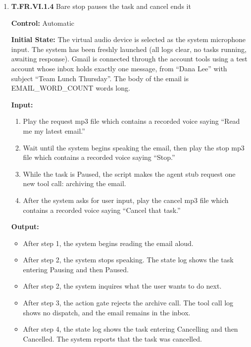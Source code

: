 \documentclass[12pt, titlepage]{article}
\begin{document}
\begin{enumerate}
\textbf{How test will be performed:} 

A script plays the audio file into the
virtual device and reads the session event log. It watches the event log for the start of
read-back speech to trigger step 2 and for the corrected read-back to trigger
step 3. After the run, the script reads the task manager's state log and task
ID. It then asserts each pass criterion above.


\item{\textbf{T.FR.VI.1.4} Bare stop pauses the task and cancel ends it\\}\label{test:T.FR.VI.1.4}

\textbf{Control:} Automatic

\textbf{Initial State:} 
The virtual audio device is selected as the system
microphone input.  The system has been freshly launched (all logs clear, no tasks running, awaiting response).
Gmail is connected through the account tools using a test account whose inbox holds exactly one message, 
from ``Dana Lee'' with subject ``Team Lunch Thursday''. The body of the email is \textsc{EMAIL\_WORD\_COUNT} words long.

\textbf{Input:}
\begin{enumerate}
  \item Play the request mp3 file which contains a recorded voice saying ``Read me my latest email.''
  \item Wait until the system begins speaking the email, then
  play the stop mp3 file which contains a recorded voice saying ``Stop.''
  \item While the task is Paused, the script makes the agent stub request one new tool call: archiving the email.
  \item After the system asks for user input, play the cancel mp3 file
  which contains a recorded voice saying ``Cancel that task.''
\end{enumerate}

\textbf{Output:}
\begin{itemize}
  \item After step 1, the system begins reading the email aloud.
  \item After step 2, the system stops speaking. The state log shows the task entering Pausing and then Paused.
  \item After step 2, the system inquires what the user wants to do next.
  \item After step 3, the action gate rejects the archive call. The tool call log shows no dispatch, and the email remains in the inbox.
  \item After step 4, the state log shows the task entering Cancelling and then Cancelled. The system reports that the task was cancelled. 
\end{itemize}


\end{enumerate}
\end{document}
